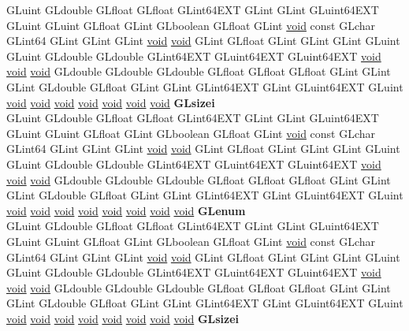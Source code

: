 \begin{DoxyCompactItemize}
\begin{tabbing}
\>GLuint GLdouble GLfloat GLfloat GLint64EXT GLint GLint GLuint64EXT GLuint GLuint GLfloat GLint GLboolean GLfloat GLint \hyperlink{interfacevoid}{void} const GLchar GLint64 GLint GLint GLint \hyperlink{interfacevoid}{void} \hyperlink{interfacevoid}{void} GLint GLfloat GLint GLint GLint GLuint GLuint GLdouble GLdouble GLint64EXT GLuint64EXT GLuint64EXT \hyperlink{interfacevoid}{void} \hyperlink{interfacevoid}{void} \hyperlink{interfacevoid}{void} GLdouble GLdouble GLdouble GLfloat GLfloat GLfloat GLint GLint GLint GLdouble GLfloat GLint GLint GLint64EXT GLint GLuint64EXT GLuint \hyperlink{interfacevoid}{void} \hyperlink{interfacevoid}{void} \hyperlink{interfacevoid}{void} \hyperlink{interfacevoid}{void} \hyperlink{interfacevoid}{void} \hyperlink{interfacevoid}{void} \hyperlink{interfacevoid}{void} {\bfseries GLsizei}\\
\>GLuint GLdouble GLfloat GLfloat GLint64EXT GLint GLint GLuint64EXT GLuint GLuint GLfloat GLint GLboolean GLfloat GLint \hyperlink{interfacevoid}{void} const GLchar GLint64 GLint GLint GLint \hyperlink{interfacevoid}{void} \hyperlink{interfacevoid}{void} GLint GLfloat GLint GLint GLint GLuint GLuint GLdouble GLdouble GLint64EXT GLuint64EXT GLuint64EXT \hyperlink{interfacevoid}{void} \hyperlink{interfacevoid}{void} \hyperlink{interfacevoid}{void} GLdouble GLdouble GLdouble GLfloat GLfloat GLfloat GLint GLint GLint GLdouble GLfloat GLint GLint GLint64EXT GLint GLuint64EXT GLuint \hyperlink{interfacevoid}{void} \hyperlink{interfacevoid}{void} \hyperlink{interfacevoid}{void} \hyperlink{interfacevoid}{void} \hyperlink{interfacevoid}{void} \hyperlink{interfacevoid}{void} \hyperlink{interfacevoid}{void} \hyperlink{interfacevoid}{void} {\bfseries GLenum}\\
\>GLuint GLdouble GLfloat GLfloat GLint64EXT GLint GLint GLuint64EXT GLuint GLuint GLfloat GLint GLboolean GLfloat GLint \hyperlink{interfacevoid}{void} const GLchar GLint64 GLint GLint GLint \hyperlink{interfacevoid}{void} \hyperlink{interfacevoid}{void} GLint GLfloat GLint GLint GLint GLuint GLuint GLdouble GLdouble GLint64EXT GLuint64EXT GLuint64EXT \hyperlink{interfacevoid}{void} \hyperlink{interfacevoid}{void} \hyperlink{interfacevoid}{void} GLdouble GLdouble GLdouble GLfloat GLfloat GLfloat GLint GLint GLint GLdouble GLfloat GLint GLint GLint64EXT GLint GLuint64EXT GLuint \hyperlink{interfacevoid}{void} \hyperlink{interfacevoid}{void} \hyperlink{interfacevoid}{void} \hyperlink{interfacevoid}{void} \hyperlink{interfacevoid}{void} \hyperlink{interfacevoid}{void} \hyperlink{interfacevoid}{void} \hyperlink{interfacevoid}{void} {\bfseries GLsizei}\\

\end{tabbing}
\end{DoxyCompactItemize}
